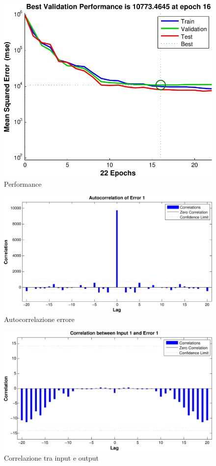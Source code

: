 \begin{figure}[htbp]
  \centering
  \includegraphics[scale=0.5]{images/timeseries/inlight/performances.pdf}
  \caption{Performance}
\end{figure}

\begin{figure}[htbp]
  \centering
  \includegraphics[scale=0.5]{images/timeseries/inlight/autocorrelations.pdf}
  \caption{Autocorrelazione errore}
\end{figure}

\begin{figure}[htbp]
  \centering
  \includegraphics[scale=0.5]{images/timeseries/inlight/correlations.pdf}
  \caption{Correlazione tra input e output}
\end{figure}

\clearpage
